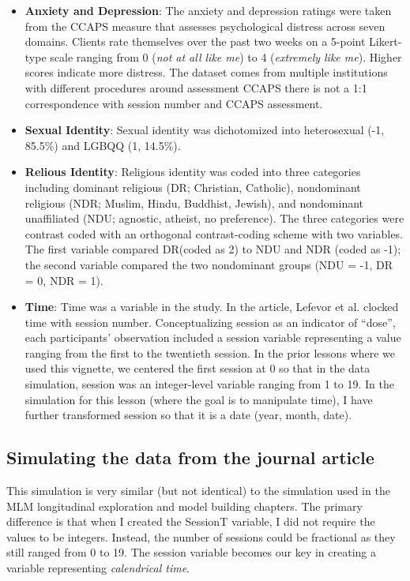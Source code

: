 \documentclass[
  11pt,
]{book}
\begin{document}
\begin{itemize}
\item
  \textbf{Anxiety and Depression}: The anxiety and depression ratings were taken from the CCAPS measure \citep{locke_development_2012} that assesses psychological distress across seven domains. Clients rate themselves over the past two weeks on a 5-point Likert-type scale ranging from 0 (\emph{not at all like me}) to 4 (\emph{extremely like me}). Higher scores indicate more distress. The dataset comes from multiple institutions with different procedures around assessment CCAPS there is not a 1:1 correspondence with session number and CCAPS assessment.
\item
  \textbf{Sexual Identity}: Sexual identity was dichotomized into heterosexual (-1, 85.5\%) and LGBQQ (1, 14.5\%).
\item
  \textbf{Relious Identity}: Religious identity was coded into three categories including dominant religious (DR; Christian, Catholic), nondominant religious (NDR; Muslim, Hindu, Buddhist, Jewish), and nondominant unaffiliated (NDU; agnostic, atheist, no preference). The three categories were contrast coded with an orthogonal contrast-coding scheme with two variables. The first variable compared DR(coded as 2) to NDU and NDR (coded as -1); the second variable compared the two nondominant groups (NDU = -1, DR = 0, NDR = 1).
\item
  \textbf{Time}: Time was a variable in the study. In the article, Lefevor et al. \citeyearpar{lefevor_religious_2017}clocked time with session number. Conceptualizing session as an indicator of ``dose'', each participants' observation included a session variable representing a value ranging from the first to the twentieth session. In the prior lessons where we used this vignette, we centered the first session at 0 so that in the data simulation, session was an integer-level variable ranging from 1 to 19. In the simulation for this lesson (where the goal is to manipulate time), I have further transformed session so that it is a date (year, month, date).
\end{itemize}

\hypertarget{simulating-the-data-from-the-journal-article-3}{%
\subsection{Simulating the data from the journal article}\label{simulating-the-data-from-the-journal-article-3}}

This simulation is very similar (but not identical) to the simulation used in the MLM longitudinal exploration and model building chapters. The primary difference is that when I created the SessionT variable, I did not require the values to be integers. Instead, the number of sessions could be fractional as they still ranged from 0 to 19. The session variable becomes our key in creating a variable representing \emph{calendrical time}.
\end{document}
